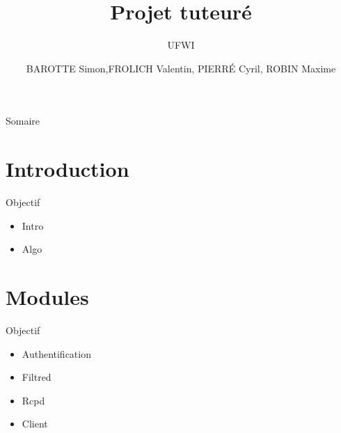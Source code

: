 \documentclass[t,12pt]{beamer}
\title{Projet tuteuré}
\subtitle{\tiny{UFWI}}
\author{BAROTTE Simon,FROLICH Valentin, PIERRÉ Cyril, ROBIN Maxime}
\begin{document}
\frame{\titlepage}


\begin{frame} 
	\begin{center}{\Large Somaire }\end{center}
	\tableofcontents[currentsection]       %
\end{frame} 

\section{Introduction}                                                    %
\begin{frame}                                                         %
    \begin{center}{\textcolor{grisbleu}{\Large Objectif}}\end{center} %
    \begin{itemize}                                                   %
	\item Intro
	\item Algo
\end{itemize}
\end{frame}                                                            %

\section{Modules}                                                    %
\begin{frame}                                                         %
    \begin{center}{\textcolor{grisbleu}{\Large Objectif}}\end{center} %
    \begin{itemize}                                                   %
	\item Authentification
	\item Filtred
	\item Rcpd
	\item Client
\end{itemize}
\end{frame}                                                            %
\end{document}
